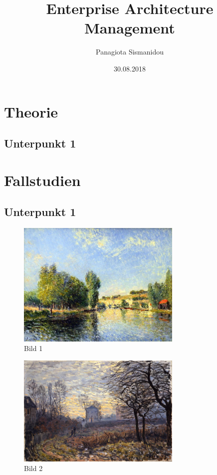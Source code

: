 \documentclass[
	A4paper,
	DIV=9,
	BCOR7mm,
	smallheadings,
	headinclude,
	footinclude,
	headsepline,
	parindent,
	german,
	captions=tableheading,
	abstracton
	]{scrreprt}
\title{Enterprise Architecture Management}
\author{Panagiota Sismanidou}
\date{30.08.2018}
\begin{document}
\maketitle

\tableofcontents

\chapter{Theorie}
\section{Unterpunkt 1}
\chapter{Fallstudien}
\section{Unterpunkt 1}


\blindtext[1]{}\autocite{:Geschwinde_Rauschdrogen}

\blindtext[2]{}\blindtext[1]{}\autocite{:Muelhardt_2013}
\begin{figure}[htbp]
\begin{center}
\includegraphics[width=0.7\textwidth]{Abbildungen/Bild1.jpg}
\caption{Bild 1}
\label{fig:Bild1}
\end{center}
\end{figure}

\blindtext[2]{}\autocite{:Wintermantel_Medizintechnik}
\begin{figure}[htbp]
\begin{center}
\includegraphics[width=0.7\textwidth]{Abbildungen/Bild2.jpg}
\caption{Bild 2}
\label{fig:Bild2}
\end{center}
\end{figure}
\end{document}
